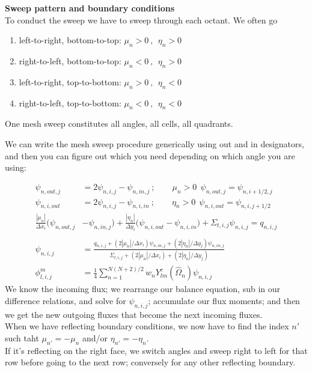 \documentclass[12pt]{article}
\newcommand{\vOmega}{\ensuremath{\hat{\Omega}}}
\begin{document}
\textbf{Sweep pattern and boundary conditions}\\
To conduct the sweep we have to sweep through each octant. We often go
\begin{enumerate}
\item left-to-right, bottom-to-top: $\mu_n > 0\:, \:\: \eta_n > 0$
\item right-to-left, bottom-to-top: $\mu_n < 0\:, \:\: \eta_n > 0$
\item left-to-right, top-to-bottom: $\mu_n > 0\:, \:\: \eta_n < 0$
\item right-to-left, top-to-bottom: $\mu_n < 0\:, \:\: \eta_n < 0$
\end{enumerate}
One mesh sweep constitutes all angles, all cells, all quadrants. 

We can write the mesh sweep procedure generically using out and in designators, and then you can figure out which you need depending on which angle you are using:

\begin{align*}
\psi_{n,out,j} &= 2\psi_{n,i,j} - \psi_{n,in,j}\:; \qquad \mu_n > 0\:\:\psi_{n,out,j} = \psi_{n,i+1/2,j} \\
\psi_{n,i,out} &= 2\psi_{n,i,j} - \psi_{n,i,in}\:; \qquad \eta_n > 0\:\:\psi_{n,i,out} = \psi_{n,i,j+1/2}\\
\frac{|\mu_n|}{\Delta x_i}\bigl(\psi_{n,out,j} &- \psi_{n,in,j}\bigr) + \frac{|\eta_n|}{\Delta y_i}\bigl(\psi_{n,i,out} - \psi_{n,i,in}\bigr) + \Sigma_{t,i,j} \psi_{n,i,j} = q_{n,i,j}\\
&\\
\psi_{n,i,j} &= \frac{q_{n,i,j} + (2|\mu_n| / \Delta x_i) \psi_{n,in,j} + (2|\eta_n| / \Delta y_j) \psi_{n,in,j}}{\Sigma_{t,i,j} + (2|\mu_n| / \Delta x_i) + (2|\eta_n| / \Delta y_j)}\\
\phi_{l,i,j}^m &= \frac{1}{4}\sum_{n=1}^{N(N+2)/2} w_n Y_{lm}^e(\vOmega_n) \psi_{n,i,j}
\end{align*}
We know the incoming flux; we rearrange our balance equation, sub in our difference relations, and solve for $\psi_{n,i,j}$; accumulate our flux moments; and then we get the new outgoing fluxes that become the next incoming fluxes.\\

When we have reflecting boundary conditions, we now have to find the index $n'$ such taht $\mu_{n'} = -\mu_n$ and/or $\eta_{n'} = -\eta_n$. \\
If it's reflecting on the right face, we switch angles and sweep right to left for that row before going to the next row; conversely for any other reflecting boundary. 
\end{document}
